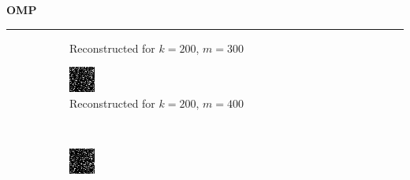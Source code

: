 \documentclass[a4paper,12pt]{article}
\newenvironment{solution}[2][]{%
    \begin{mdframed}[linecolor=blue!70!black, linewidth=2pt, roundcorner=10pt, backgroundcolor=yellow!10!white, skipabove=12pt, skipbelow=12pt]%
        \textbf{\large #2}
        \par\noindent\rule{\textwidth}{0.4pt}
}{
    \end{mdframed}
}
\begin{document}
\begin{solution}{OMP}
\begin{figure}[H]
\begin{subfigure}[t]{0.23\textwidth}
        \caption{Reconstructed for $k = 200$, $m = 300$}
    \end{subfigure}
    \begin{subfigure}[t]{0.23\textwidth}
        \centering
        \includegraphics[width=\textwidth]{../images/omp/Reconstructed_k_200_m_400.png}
        \caption{Reconstructed for $k = 200$, $m = 400$}
    \end{subfigure}\\
    \begin{subfigure}[t]{0.23\textwidth}
        \centering
        \includegraphics[width=\textwidth]{../images/omp/Reconstructed_k_200_m_500.png}

\end{subfigure}
\end{figure}
\end{solution}
\end{document}
